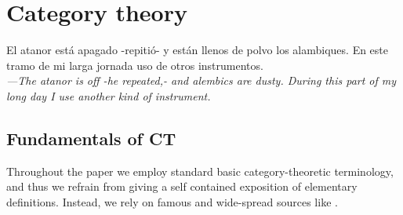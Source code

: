 \section{Category theory}
\epigraph{El atanor está apagado -repitió- y están llenos de polvo los alambiques. En este tramo
	de mi larga jornada uso de otros instrumentos.\\[2mm]
	\footnotesize\emph{---The atanor is off -he repeated,- and alembics are dusty. During this part
	of my long day I use another kind of instrument.}}{\cite{arena}}
\subsection{Fundamentals of CT}
Throughout the paper we employ standard basic category-theoretic terminology, and thus we refrain from giving a self contained exposition of elementary definitions. Instead, we rely on famous and wide-spread sources like \cite{Bor1,Bor2,McL,riehlcontext,leinster2014basic,simmons2011introduction}.

